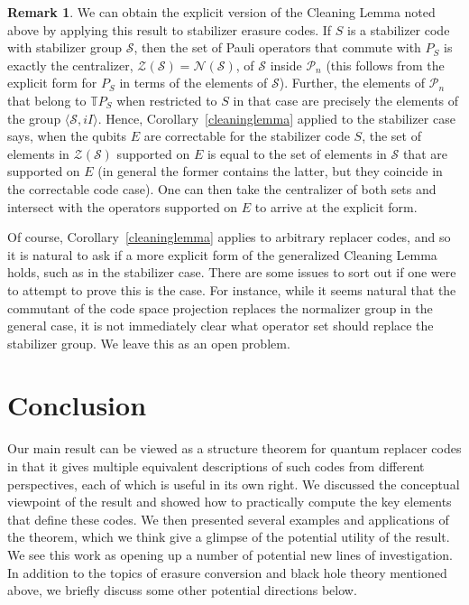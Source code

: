 \documentclass[11pt]{amsart}
\theoremstyle{definition}
\theoremstyle{definition}
\theoremstyle{definition}
\newtheorem{remark}[thm]{Remark}
\newcommand{\1}{\mathbb{I}}
\begin{document}
\begin{remark}
We can obtain the explicit version of the Cleaning Lemma noted above by applying this result to stabilizer erasure codes. If $S$ is a stabilizer code with stabilizer group $\mathcal S$, then the set of Pauli operators that commute with $P_S$ is exactly the centralizer, $\mathcal Z(\mathcal S) = \mathcal N(\mathcal S)$, of $\mathcal S$ inside $\mathcal P_n$ (this follows from the explicit form for $P_S$ in terms of the elements of $\mathcal S$). Further, the elements of $\mathcal P_n$ that belong to $\mathbb{T} P_S$ when restricted to $S$ in that case are precisely the elements of the group $\langle \mathcal S, iI \rangle$. Hence, Corollary~\ref{cleaninglemma} applied to the stabilizer case says, when the qubits $E$ are correctable for the stabilizer code $S$, the set of elements in $\mathcal Z(\mathcal S)$ supported on $E$ is equal to the set of elements in $\mathcal S$ that are supported on $E$ (in general the former contains the latter, but they coincide in the correctable code case). One can then take the centralizer of both sets and intersect with the operators supported on $E$ to arrive at the explicit form.      

Of course, Corollary~\ref{cleaninglemma} applies to arbitrary replacer codes, and so it is natural to ask if a more explicit form of the generalized Cleaning Lemma holds, such as in the stabilizer case. There are some issues to sort out if one were to attempt to prove this is the case. For instance, while it seems natural that the commutant of the code space projection replaces the normalizer group in the general case, it is not immediately clear what operator set should replace the stabilizer group. We leave this as an open problem. 
\end{remark}




\section{Conclusion}\label{sec:conclusion}

Our main result can be viewed as a structure theorem for quantum replacer codes in that it gives multiple equivalent descriptions of such codes from different perspectives, each of which is useful in its own right. We discussed the conceptual viewpoint of the result and showed how to practically compute the key elements that define these codes. We then presented several examples and applications of the theorem, which we think give a glimpse of the potential utility of the result. We see this work as opening up a number of potential new lines of investigation. In addition to the topics of erasure conversion \cite{WKST22,Ketal23,KCB23} and black hole theory \cite{AXH15} mentioned above, we briefly discuss some other potential directions below. 
\end{document}
